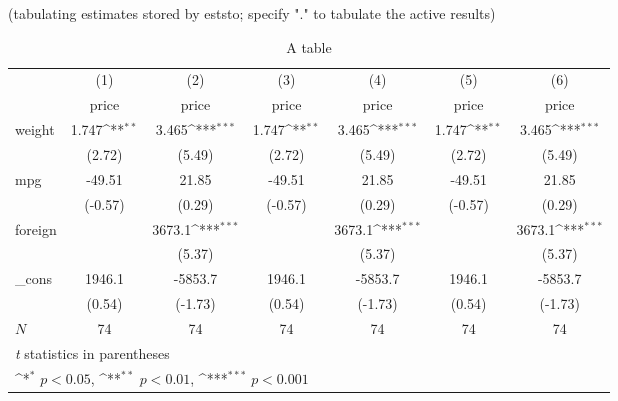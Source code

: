 \documentclass[10pt,parskip=half,
	toc=sectionentrywithdots,
	bibliography=totocnumbered,
	captions=tableheading,numbers=noendperiod]{scrartcl}
\begin{document}
\begin{table}[H]\caption{A table}\label{tbl:tlabel}

\centering
\begin{adjustbox}{max width=\textwidth}
(tabulating estimates stored by eststo; specify "." to tabulate the active results)

{
\def\sym#1{\ifmmode^{#1}\else\(^{#1}\)\fi}
\begin{tabular}{l*{6}{c}}
\hline\hline
            &\multicolumn{1}{c}{(1)}&\multicolumn{1}{c}{(2)}&\multicolumn{1}{c}{(3)}&\multicolumn{1}{c}{(4)}&\multicolumn{1}{c}{(5)}&\multicolumn{1}{c}{(6)}\\
            &\multicolumn{1}{c}{price}&\multicolumn{1}{c}{price}&\multicolumn{1}{c}{price}&\multicolumn{1}{c}{price}&\multicolumn{1}{c}{price}&\multicolumn{1}{c}{price}\\
\hline
weight      &       1.747\sym{**} &       3.465\sym{***}&       1.747\sym{**} &       3.465\sym{***}&       1.747\sym{**} &       3.465\sym{***}\\
            &      (2.72)         &      (5.49)         &      (2.72)         &      (5.49)         &      (2.72)         &      (5.49)         \\
[1em]
mpg         &      -49.51         &       21.85         &      -49.51         &       21.85         &      -49.51         &       21.85         \\
            &     (-0.57)         &      (0.29)         &     (-0.57)         &      (0.29)         &     (-0.57)         &      (0.29)         \\
[1em]
foreign     &                     &      3673.1\sym{***}&                     &      3673.1\sym{***}&                     &      3673.1\sym{***}\\
            &                     &      (5.37)         &                     &      (5.37)         &                     &      (5.37)         \\
[1em]
\_cons      &      1946.1         &     -5853.7         &      1946.1         &     -5853.7         &      1946.1         &     -5853.7         \\
            &      (0.54)         &     (-1.73)         &      (0.54)         &     (-1.73)         &      (0.54)         &     (-1.73)         \\
\hline
\(N\)       &          74         &          74         &          74         &          74         &          74         &          74         \\
\hline\hline
\multicolumn{7}{l}{\footnotesize \textit{t} statistics in parentheses}\\
\multicolumn{7}{l}{\footnotesize \sym{*} \(p<0.05\), \sym{**} \(p<0.01\), \sym{***} \(p<0.001\)}\\
\end{tabular}
}

\end{adjustbox}
\end{table}
\end{document}
